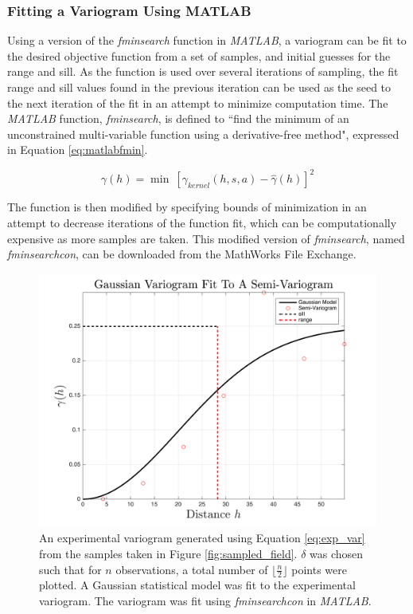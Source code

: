 \subsubsection{Fitting a Variogram Using MATLAB}
Using a version of the \textit{fminsearch} function in \textit{MATLAB}, a variogram can be fit to the desired objective function from a set of samples, and initial guesses for the range and sill. As the function is used over several iterations of sampling, the fit range and sill values found in the previous iteration can be used as the seed to the next iteration of the fit in an attempt to minimize computation time. The \textit{MATLAB} function, \textit{fminsearch}, is defined to ``find the minimum of an unconstrained multi-variable function using a derivative-free method", expressed in Equation \ref{eq:matlabfmin}.

\begin{equation}
    \gamma(h) = \min\ [\gamma_{kernel}(h,s,a) - \hat{\gamma}(h)]^2
    \label{eq:matlabfmin}
\end{equation}

The function is then modified by specifying bounds of minimization in an attempt to decrease iterations of the function fit, which can be computationally expensive as more samples are taken. This modified version of \textit{fminsearch}, named \textit{fminsearchcon}, can be downloaded from the MathWorks File Exchange.

\begin{figure}[ht!]
    \centering    
	\includegraphics[width=0.8\linewidth]{figures/fit_kernel.png}
    \ssp
	\caption{An experimental variogram generated using Equation \ref{eq:exp_var} from the samples taken in Figure \ref{fig:sampled_field}. $\delta$ was chosen such that for $n$ observations, a total number of $\Big\lfloor \frac{n}{2} \Big\rfloor$ points were plotted. A Gaussian statistical model was fit to the experimental variogram. The variogram was fit using \textit{fminsearchcon} in \textit{MATLAB}.}
	\label{fig:fit_kernel}
\end{figure}

